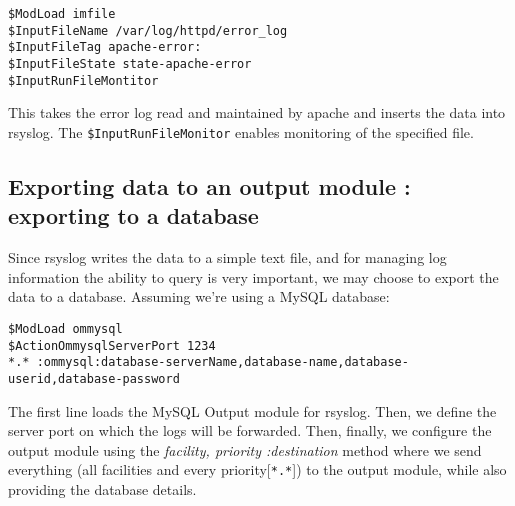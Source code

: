 \vspace{-15pt}
\begin{verbatim}
$ModLoad imfile
$InputFileName /var/log/httpd/error_log
$InputFileTag apache-error:
$InputFileState state-apache-error
$InputRunFileMontitor
\end{verbatim}
\vspace{-10pt}	

\noindent
This takes the error log read and maintained by apache and inserts the data into rsyslog. The \verb|$InputRunFileMonitor| enables monitoring of the specified file. 

\subsection{Exporting data to an output module : exporting to a database}
Since rsyslog writes the data to a simple text file, and for managing log information the ability to query is very important, we may choose to export the data to a database. Assuming we're using a MySQL database:

\vspace{-15pt}
\begin{verbatim}
$ModLoad ommysql
$ActionOmmysqlServerPort 1234
*.* :ommysql:database-serverName,database-name,database-userid,database-password
\end{verbatim}
\vspace{-10pt}	

\noindent
The first line loads the MySQL Output module for rsyslog. Then, we define the server port on which the logs will be forwarded. Then, finally, we configure the output module using the \textit{facility, priority :destination} method where we send everything (all facilities and every priority[\verb|*.*|]) to the output module, while also providing the database details. 